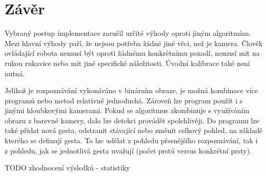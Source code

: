 \chapter{Závěr}
Vybraný postup implementace zaručil určité výhody oproti jiným algoritmům. Mezi hlavní výhody paří, že nejsou potřeba žádné jiné věci, než je kamera. Člověk ovládající robota nemusí  být oproti žádnému konkrétnímu pozadí, nemusí mít na rukou rukavice nebo mít jiné specifické náležitosti. Úvodní kalibrace také není nutná. 

Jelikož je rozpoznávání vykonáváno v binárním obraze, je možná kombinace více programů nebo metod relativně jednoduchá. Zároveň lze program použít i s jinými hloubkovými kamerami. Pokud se algoritmus zkombinuje s využíváním obrazu z barevné kamery, dalo lze detekci provádět spolehlivěji.
Do programu lze také přidat nová gesta, odstranit stávající nebo změnit celkový pohled, na základě kterého se definují gesta. To lze udělat z pohledu přesnějšího rozpoznávání, tak i z pohledu, jak se jednotlivá gesta uvažují (počet prstů versus konkrétní prsty). 

TODO zhodnocení výsledků - statistiky


\endinput
